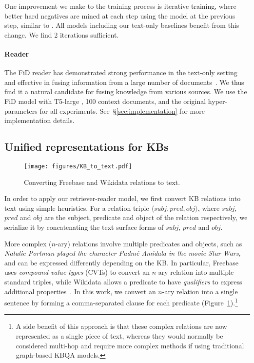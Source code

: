 \documentclass[11pt]{article}
\newcommand{\secref}[1]{\S\ref{#1}}
\begin{document}
One improvement we make to the training process is iterative training, where better hard negatives are mined at each step using the model at the previous step, similar to \citep{xiong2020approximate}.  All models including our text-only baselines benefit from this change.  We find 2 iterations sufficient.

\paragraph{Reader}
The FiD reader has demonstrated strong performance in the text-only setting and effective in fusing information from a large number of documents~\citep{izacard-grave-2021-leveraging}.  We thus find it a natural candidate for fusing knowledge from various sources.
We use the FiD model with T5-large \citep{t5}, 100 context documents, and the original hyper-parameters for all experiments.
See~\secref{sec:implementation} for more implementation details.

\subsection{Unified representations for KBs}\label{sec:model:kbqa}


\begin{figure}
    \centering
    \texttt{[image: figures/KB\_to\_text.pdf]}
    \caption{Converting Freebase and Wikidata relations to text.}
    \label{fig:kb_to_text_example}
    \vspace{-3mm}
\end{figure}

In order to apply our retriever-reader model, we first convert KB relations into text using simple heuristics.
For a relation triple $\langle subj, pred, obj\rangle$, where $subj$, $pred$ and $obj$ are the subject, predicate and object of the relation respectively, we serialize it by concatenating the text surface forms of $subj$, $pred$ and $obj$.

More complex ($n$-ary) relations involve multiple predicates and objects, such as \emph{Natalie Portman played the character Padm\'e Amidala in the movie Star Wars}, and can be expressed differently depending on the KB.
In particular, Freebase uses \emph{compound value types} (CVTs) to convert an $n$-ary relation into multiple standard triples, while Wikidata allows a predicate to have \emph{qualifiers} to express additional properties~\cite{freebase2wikidata}.
In this work, we convert an $n$-ary relation into a single sentence by forming a comma-separated clause for each predicate (Figure~\ref{fig:kb_to_text_example}).\footnote{A side benefit of this approach is that these complex relations are now represented as a single piece of text, whereas they would normally be considered multi-hop and require more complex methods \citep{fu2020survey} if using traditional graph-based KBQA models.}
\end{document}
